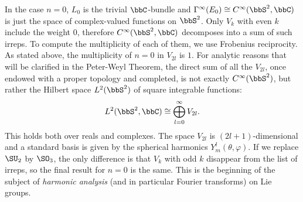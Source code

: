 \begin{example}
    In the case $n=0$, $L_0$ is the trivial $\bbC$-bundle and $\Gamma^\infty(E_0)\cong C^\infty(\bbS^2,\bbC)$ is just the space of complex-valued functions on $\bbS^2$. Only $V_k$ with even $k$ include the weight $0$, therefore $C^\infty(\bbS^2,\bbC)$ decomposes into a sum of such irreps. To compute the multiplicity of each of them, we use Frobenius reciprocity. As stated above, the multiplicity of $n=0$ in $V_{2l}$ is $1$. For analytic reasons that will be clarified in the Peter-Weyl Theorem, the direct sum of all the $V_{2l}$, once endowed with a proper topology and completed, is not exactly $C^\infty(\bbS^2)$, but rather the Hilbert space $L^2(\bbS^2)$ of square integrable functions:
    \[L^2(\bbS^2,\bbC)\cong \bigoplus_{l=0}^\infty V_{2l}.\]
    This holds both over reals and complexes. The space $V_{2l}$ is $(2l+1)$-dimensional and a standard basis is given by the spherical harmonics $Y^l_m(\theta,\varphi)$. If we replace $\SU_2$ by $\SO_3$, the only difference is that $V_k$ with odd $k$ disappear from the list of irreps, so the final result for $n=0$ is the same. This is the beginning of the subject of \emph{harmonic analysis} (and in particular Fourier transforms) on Lie groups.
\end{example}








